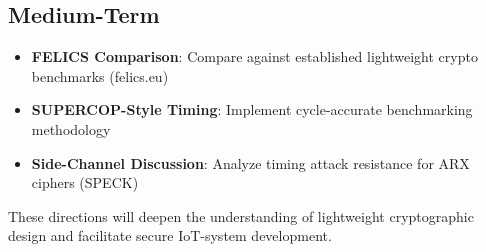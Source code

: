 \documentclass[12pt]{report}
\begin{document}
\subsection{Medium-Term}

\begin{itemize}
    \item \textbf{FELICS Comparison}: Compare against established lightweight crypto benchmarks (felics.eu)
    \item \textbf{SUPERCOP-Style Timing}: Implement cycle-accurate benchmarking methodology
    \item \textbf{Side-Channel Discussion}: Analyze timing attack resistance for ARX ciphers (SPECK)
\end{itemize}

These directions will deepen the understanding of lightweight cryptographic design and facilitate secure IoT-system development.
\end{document}
